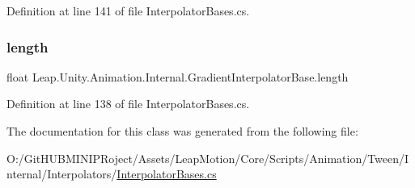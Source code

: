 Definition at line 141 of file Interpolator\+Bases.\+cs.

\mbox{\label{class_leap_1_1_unity_1_1_animation_1_1_internal_1_1_gradient_interpolator_base_ae1a4415a87d2d844ab44600443cd8aca}} 
\subsubsection{\texorpdfstring{length}{length}}
{\footnotesize\ttfamily float Leap.\+Unity.\+Animation.\+Internal.\+Gradient\+Interpolator\+Base.\+length\hspace{0.3cm}{\ttfamily [get]}}



Definition at line 138 of file Interpolator\+Bases.\+cs.



The documentation for this class was generated from the following file\+:\begin{DoxyCompactItemize}
\item 
O\+:/\+Git\+H\+U\+B\+M\+I\+N\+I\+P\+Roject/\+Assets/\+Leap\+Motion/\+Core/\+Scripts/\+Animation/\+Tween/\+Internal/\+Interpolators/\mbox{\hyperlink{_interpolator_bases_8cs}{Interpolator\+Bases.\+cs}}\end{DoxyCompactItemize}
